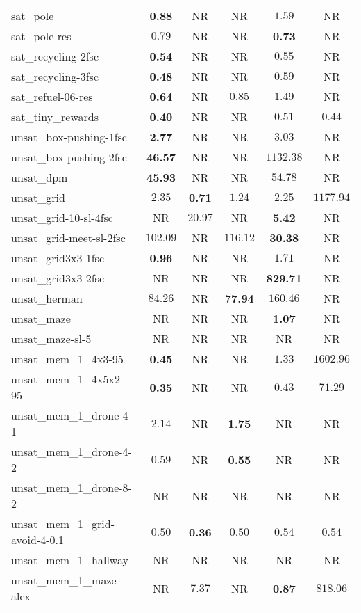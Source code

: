 \begin{tabular}{lccccc}
sat\_pole & \textbf{0.88} & NR & NR & $1.59$ & NR \\
sat\_pole-res & $0.79$ & NR & NR & \textbf{0.73} & NR \\
sat\_recycling-2fsc & \textbf{0.54} & NR & NR & $0.55$ & NR \\
sat\_recycling-3fsc & \textbf{0.48} & NR & NR & $0.59$ & NR \\
sat\_refuel-06-res & \textbf{0.64} & NR & $0.85$ & $1.49$ & NR \\
sat\_tiny\_rewards & \textbf{0.40} & NR & NR & $0.51$ & $0.44$ \\
unsat\_box-pushing-1fsc & \textbf{2.77} & NR & NR & $3.03$ & NR \\
unsat\_box-pushing-2fsc & \textbf{46.57} & NR & NR & $1132.38$ & NR \\
unsat\_dpm & \textbf{45.93} & NR & NR & $54.78$ & NR \\
unsat\_grid & $2.35$ & \textbf{0.71} & $1.24$ & $2.25$ & $1177.94$ \\
unsat\_grid-10-sl-4fsc & NR & $20.97$ & NR & \textbf{5.42} & NR \\
unsat\_grid-meet-sl-2fsc & $102.09$ & NR & $116.12$ & \textbf{30.38} & NR \\
unsat\_grid3x3-1fsc & \textbf{0.96} & NR & NR & $1.71$ & NR \\
unsat\_grid3x3-2fsc & NR & NR & NR & \textbf{829.71} & NR \\
unsat\_herman & $84.26$ & NR & \textbf{77.94} & $160.46$ & NR \\
unsat\_maze & NR & NR & NR & \textbf{1.07} & NR \\
unsat\_maze-sl-5 & NR & NR & NR & NR & NR \\
unsat\_mem\_1\_4x3-95 & \textbf{0.45} & NR & NR & $1.33$ & $1602.96$ \\
unsat\_mem\_1\_4x5x2-95 & \textbf{0.35} & NR & NR & $0.43$ & $71.29$ \\
unsat\_mem\_1\_drone-4-1 & $2.14$ & NR & \textbf{1.75} & NR & NR \\
unsat\_mem\_1\_drone-4-2 & $0.59$ & NR & \textbf{0.55} & NR & NR \\
unsat\_mem\_1\_drone-8-2 & NR & NR & NR & NR & NR \\
unsat\_mem\_1\_grid-avoid-4-0.1 & $0.50$ & \textbf{0.36} & $0.50$ & $0.54$ & $0.54$ \\
unsat\_mem\_1\_hallway & NR & NR & NR & NR & NR \\
unsat\_mem\_1\_maze-alex & NR & $7.37$ & NR & \textbf{0.87} & $818.06$ \\

\end{tabular}
